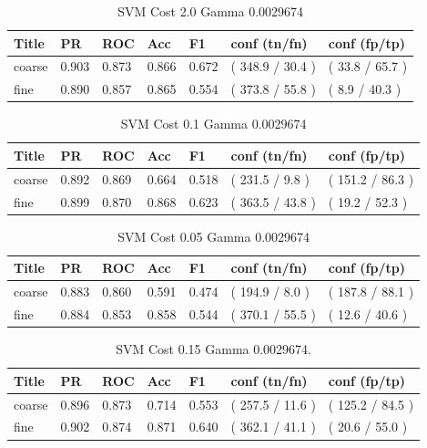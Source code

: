 \documentclass[ms]{nuthesis}
\begin{document}
\FloatBarrier
\begin{table}[H]
\centering
\caption{SVM Cost 2.0 Gamma 0.0029674}
\label{tab:SVM-C2-Gp0029674}
\begin{tabular}{|l||l||l||l||l||l||l|}\toprule
Title & PR & ROC & Acc & F1 & conf (tn/fn) & conf (fp/tp) \\ \midrule
coarse & 0.903 & 0.873 & 0.866 & 0.672 & ( 348.9 / 30.4 ) & ( 33.8 / 65.7 ) \\
fine & 0.890 & 0.857 & 0.865 & 0.554 & ( 373.8 / 55.8 ) & ( 8.9 / 40.3 ) \\ \bottomrule
\end{tabular}
\end{table}
\FloatBarrier



\FloatBarrier
\begin{table}[H]
\centering
\caption{SVM Cost 0.1 Gamma 0.0029674}
\label{tab:SVM-Cp1-Gp0029674}
\begin{tabular}{|l||l||l||l||l||l||l|}\toprule
Title & PR & ROC & Acc & F1 & conf (tn/fn) & conf (fp/tp) \\ \midrule
coarse & 0.892 & 0.869 & 0.664 & 0.518 & ( 231.5 / 9.8 ) & ( 151.2 / 86.3 ) \\
fine & 0.899 & 0.870 & 0.868 & 0.623 & ( 363.5 / 43.8 ) & ( 19.2 / 52.3 ) \\ \bottomrule
\end{tabular}
\end{table}
\FloatBarrier


\FloatBarrier
\begin{table}[H]
\centering
\caption{SVM Cost 0.05 Gamma 0.0029674}
\label{tab:SVM-Cp05-Gp0029674}
\begin{tabular}{|l||l||l||l||l||l||l|}\toprule
Title & PR & ROC & Acc & F1 & conf (tn/fn) & conf (fp/tp) \\ \midrule
coarse & 0.883 & 0.860 & 0.591 & 0.474 & ( 194.9 / 8.0 ) & ( 187.8 / 88.1 ) \\
fine & 0.884 & 0.853 & 0.858 & 0.544 & ( 370.1 / 55.5 ) & ( 12.6 / 40.6 ) \\ \bottomrule
\end{tabular}
\end{table}
\FloatBarrier


\FloatBarrier
\begin{table}[H]
\centering
\caption{SVM Cost 0.15 Gamma 0.0029674.}
\label{tab:SVM-Cp15-Gp0029674}
\begin{tabular}{|l||l||l||l||l||l||l|}\toprule
Title & PR & ROC & Acc & F1 & conf (tn/fn) & conf (fp/tp) \\ \midrule
coarse & 0.896 & 0.873 & 0.714 & 0.553 & ( 257.5 / 11.6 ) & ( 125.2 / 84.5 ) \\
fine & 0.902 & 0.874 & 0.871 & 0.640 & ( 362.1 / 41.1 ) & ( 20.6 / 55.0 ) \\ \bottomrule
\end{tabular}
\end{table}
\FloatBarrier
\end{document}

